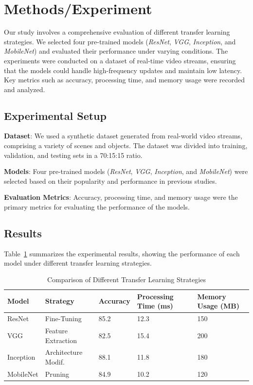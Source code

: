 \documentclass{article}
\begin{document}
\section{Methods/Experiment}
\label{sec:methods}
Our study involves a comprehensive evaluation of different transfer learning strategies. We selected four pre-trained models (\textit{ResNet}, \textit{VGG}, \textit{Inception}, and \textit{MobileNet}) and evaluated their performance under varying conditions. The experiments were conducted on a dataset of real-time video streams, ensuring that the models could handle high-frequency updates and maintain low latency. Key metrics such as accuracy, processing time, and memory usage were recorded and analyzed.

\subsection{Experimental Setup}
\label{subsec:setup}
\textbf{Dataset}: We used a synthetic dataset generated from real-world video streams, comprising a variety of scenes and objects. The dataset was divided into training, validation, and testing sets in a 70:15:15 ratio.

\textbf{Models}: Four pre-trained models (\textit{ResNet}, \textit{VGG}, \textit{Inception}, and \textit{MobileNet}) were selected based on their popularity and performance in previous studies.

\textbf{Evaluation Metrics}: Accuracy, processing time, and memory usage were the primary metrics for evaluating the performance of the models.

\subsection{Results}
\label{subsec:results}
Table~\ref{tab:results} summarizes the experimental results, showing the performance of each model under different transfer learning strategies.

\begin{table}[ht]
\centering
\caption{Comparison of Different Transfer Learning Strategies}
\label{tab:results}
\begin{tabular}{@{}lllll@{}}
\toprule
\textbf{Model} & \textbf{Strategy} & \textbf{Accuracy} & \textbf{Processing Time (ms)} & \textbf{Memory Usage (MB)} \\ \midrule
ResNet        & Fine-Tuning       & 85.2               & 12.3                         & 150                       \\
VGG           & Feature Extraction & 82.5               & 15.4                         & 200                       \\
Inception     & Architecture Modif. & 88.1               & 11.8                         & 180                       \\
MobileNet     & Pruning           & 84.9               & 10.2                         & 120                       \\ \bottomrule
\end{tabular}
\end{table}
\end{document}
